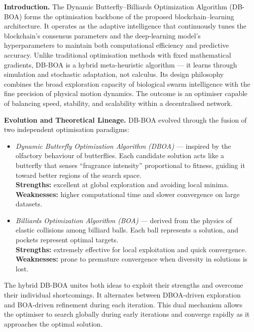 \textbf{Introduction.}
The Dynamic Butterfly–Billiards Optimization Algorithm (DB-BOA) forms the optimisation backbone of the proposed blockchain–learning architecture. It operates as the adaptive intelligence that continuously tunes the blockchain's consensus parameters and the deep-learning model's hyperparameters to maintain both computational efficiency and predictive accuracy. Unlike traditional optimisation methods with fixed mathematical gradients, DB-BOA is a hybrid meta-heuristic algorithm — it learns through simulation and stochastic adaptation, not calculus. Its design philosophy combines the broad exploration capacity of biological swarm intelligence with the fine precision of physical motion dynamics. The outcome is an optimiser capable of balancing speed, stability, and scalability within a decentralised network.

\textbf{Evolution and Theoretical Lineage.}
DB-BOA evolved through the fusion of two independent optimisation paradigms:
\begin{itemize}
    \item \textit{Dynamic Butterfly Optimization Algorithm (DBOA)} — inspired by the olfactory behaviour of butterflies. Each candidate solution acts like a butterfly that senses ``fragrance intensity'' proportional to fitness, guiding it toward better regions of the search space.\\
    \textbf{Strengths:} excellent at global exploration and avoiding local minima.\\
    \textbf{Weaknesses:} higher computational time and slower convergence on large datasets.
    \item \textit{Billiards Optimization Algorithm (BOA)} — derived from the physics of elastic collisions among billiard balls. Each ball represents a solution, and pockets represent optimal targets.\\
    \textbf{Strengths:} extremely effective for local exploitation and quick convergence.\\
    \textbf{Weaknesses:} prone to premature convergence when diversity in solutions is lost.
\end{itemize}

The hybrid DB-BOA unites both ideas to exploit their strengths and overcome their individual shortcomings. It alternates between DBOA-driven exploration and BOA-driven refinement during each iteration. This dual mechanism allows the optimiser to search globally during early iterations and converge rapidly as it approaches the optimal solution.

